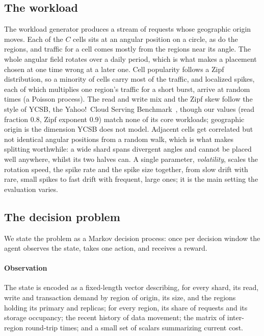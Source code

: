 \subsection{The workload}

The workload generator produces a stream of requests whose geographic origin
moves. Each of the $C$ cells sits at an angular position on a circle, as do the
regions, and traffic for a cell comes mostly from the regions near its angle.
The whole angular field rotates over a daily period, which is what makes a
placement chosen at one time wrong at a later one. Cell popularity follows a
Zipf distribution, so a minority of cells carry most of the traffic, and
localized spikes, each of which multiplies one region's traffic for a short
burst, arrive at random times (a Poisson process). The read and write mix and
the Zipf skew follow the style of YCSB, the Yahoo!\ Cloud Serving
Benchmark~\cite{cooper2010ycsb}, though our values (read fraction 0.8, Zipf
exponent 0.9) match none of its core workloads; geographic origin is the
dimension YCSB does not model. Adjacent cells get correlated but not identical
angular positions from a random walk, which is what makes splitting
worthwhile: a wide shard spans divergent angles and cannot be placed well
anywhere, whilst its two halves can. A single parameter, \emph{volatility},
scales the rotation speed, the spike rate and the spike size together, from
slow drift with rare, small spikes to fast drift with frequent, large ones; it
is the main setting the evaluation varies.

\subsection{The decision problem}

We state the problem as a Markov decision process: once per decision window
the agent observes the state, takes one action, and receives a reward.

\paragraph{Observation} The state is encoded as a fixed-length vector
describing, for every shard, its read, write and transaction demand by
region of origin, its size, and the regions holding its primary and replicas;
for every region, its share of requests and its storage occupancy;
the recent history of data movement; the matrix of inter-region round-trip
times; and a small set of scalars summarizing current cost.


